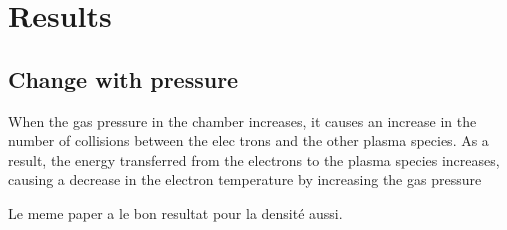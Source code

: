 \section{Results}

\subsection{Change with pressure}
When the gas
pressure in the chamber increases, it causes an
increase in the number of collisions between the elec
trons and the other plasma species. As a result, the
energy transferred from the electrons to the plasma
species increases, causing a decrease in the electron
temperature by increasing the gas pressure

Le meme paper a le bon resultat pour la densité aussi.